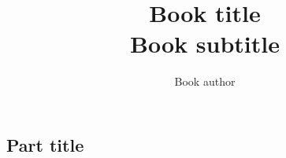 \documentclass[oneside]{book} %
\newcommand{\bookTitle}{Book title} %
\newcommand{\bookSubtitle}{Book subtitle} %
\newcommand{\bookAuthor}{Book author} %
\begin{document}
    \begin{spacing}{1.5} %
        
        
        \frontmatter
        
        \title{\Huge{\textbf{\bookTitle}} \\ \LARGE{\bookSubtitle}} %
        \author{\bookAuthor} %
        \date{} %

        \maketitle %

        
        \setcounter{tocdepth}{1} %
        \tableofcontents %


        \mainmatter
        
        \part{Part title}
            
        
        \backmatter
        
    \end{spacing}
\end{document}
